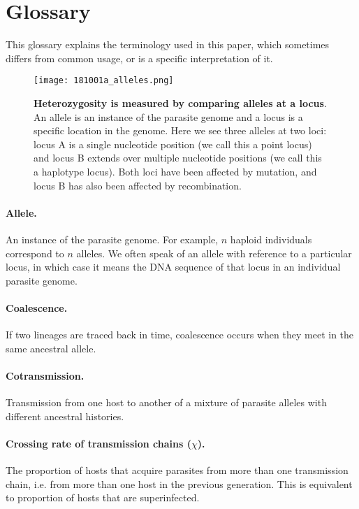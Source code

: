 \documentclass[_main.tex]{subfiles}
\begin{document}
\section*{Glossary}
\label{supp_glossary}

This glossary explains the terminology used in this paper, which sometimes differs from common usage, or is a specific interpretation of it. 

\begin{figure}[h!]
\centering
\texttt{[image: 181001a\_alleles.png]}
\caption{\textbf{Heterozygosity is measured by comparing alleles at a locus}.  An allele is an instance of the parasite genome and a locus is a specific location in the genome.  Here we see three alleles at two loci: locus A is a single nucleotide position (we call this a point locus) and locus B extends over multiple nucleotide positions (we call this a haplotype locus).  Both loci have been affected by mutation, and locus B has also been affected by recombination.}
\label{fig:supp_graph_17}
\end{figure}

\paragraph{Allele.}  An instance of the parasite genome.  For example, $n$ haploid individuals correspond to $n$ alleles.  We often speak of an allele with reference to a particular locus, in which case it means the DNA sequence of that locus in an individual parasite genome.  

\paragraph{Coalescence.}  If two lineages are traced back in time, coalescence occurs when they meet in the same ancestral allele.

\paragraph{Cotransmission.}  Transmission from one host to another of a mixture of parasite alleles with different ancestral histories.

\paragraph{Crossing rate of transmission chains ($\chi$).}  The proportion of hosts that acquire parasites from more than one transmission chain, i.e. from more than one host in the previous generation.  This is equivalent to proportion of hosts that are superinfected.
\end{document}
